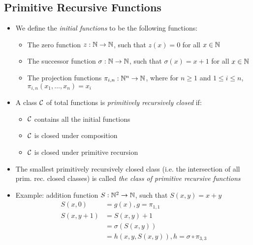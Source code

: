 \begin{itemize}
\end{itemize}

\subsection{Primitive Recursive Functions}

\begin{itemize}
	
	\item We define the \textit{initial functions} to be the following functions:
	
	\begin{itemize}
		
		\item The zero function $ z: \mathbb{N} \to \mathbb{N} $, such that $ z(x) = 0 $ for all $ x \in \mathbb{N} $
		
		\item The successor function $ \sigma: \mathbb{N} \to \mathbb{N} $, such that $ \sigma(x) = x + 1 $ for all $ x \in \mathbb{N} $
		
		\item The projection functions $ \pi_{i, n}: \mathbb{N}^n \to \mathbb{N} $, where for $ n \ge 1 $ and $ 1 \le i \le n $, $ \pi_{i, n}(x_1, \dots, x_n) = x_i $
		
	\end{itemize}

	\item A class $ \mathcal{C} $ of total functions is \textit{primitively recursively closed} if:
	
	\begin{itemize}
		
		\item $ \mathcal{C} $ contains all the initial functions
		
		\item $ \mathcal{C} $ is closed under composition
		
		\item $ \mathcal{C} $ is closed under primitive recursion
		
	\end{itemize}

	\item The smallest primitively recursively closed class (i.e. the intersection of all prim. rec. closed classes) is called \textit{the class of primitive recursive functions}
	
	\item Example: addition function $ S: \mathbb{N}^2 \to \mathbb{N} $, such that $ S(x, y) = x + y $
	\begin{align*}
	S(x, 0) &= g(x), g = \pi_{1, 1}\\
	S(x, y  + 1) &= S(x, y) + 1\\
				 &= \sigma(S(x, y))\\
				 &= h(x, y, S(x, y)), h = \sigma \circ \pi_{3, 3}
	\end{align*}
	

\end{itemize}
